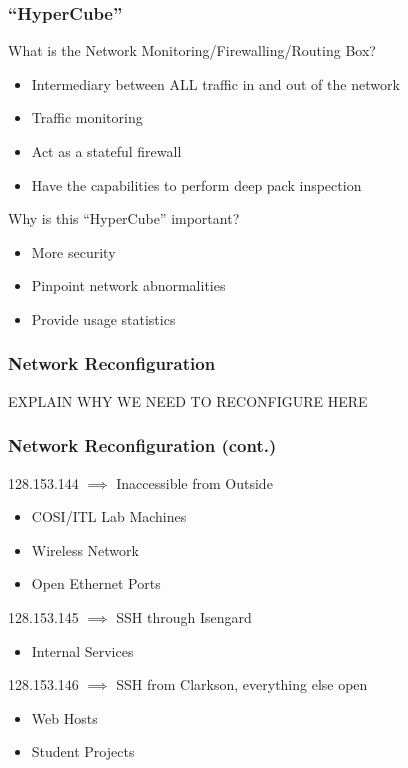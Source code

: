 \documentclass{beamer}
\begin{document}
\begin{frame}
  \frametitle{``HyperCube''}
What is the Network Monitoring/Firewalling/Routing Box?
  \begin{itemize}
    \item Intermediary between ALL traffic in and out of the network
    \item Traffic monitoring
    \item Act as a stateful firewall
    \item Have the capabilities to perform deep pack inspection
  \end{itemize}
Why is this ``HyperCube'' important?
  \begin{itemize}
    \item More security
    \item Pinpoint network abnormalities
    \item Provide usage statistics
  \end{itemize}
\end{frame}

\begin{frame}
  \frametitle{Network Reconfiguration}
EXPLAIN WHY WE NEED TO RECONFIGURE HERE
\end{frame}

\begin{frame}
  \frametitle{Network Reconfiguration (cont.)}
128.153.144 $\implies$ Inaccessible from Outside
  \begin{itemize}
    \item COSI/ITL Lab Machines
    \item Wireless Network
    \item Open Ethernet Ports
  \end{itemize}
128.153.145 $\implies$ SSH through Isengard
  \begin{itemize}
    \item Internal Services
  \end{itemize}
128.153.146 $\implies$ SSH from Clarkson, everything else open
  \begin{itemize}
    \item Web Hosts
    \item Student Projects
  \end{itemize}
\end{frame}
\end{document}
